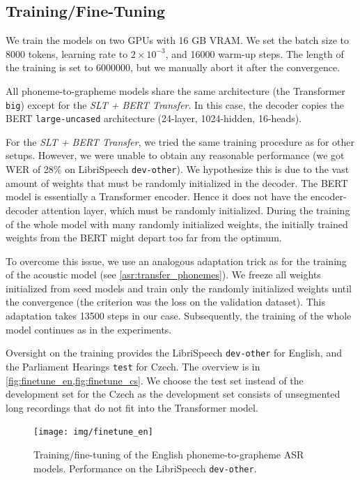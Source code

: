\subsection{Training/Fine-Tuning}
We train the models on two GPUs with 16 GB VRAM. We set the batch size to 8000 tokens, learning rate to $2 \times 10^{-3}$, and 16000 warm-up steps. The length of the training is set to 6000000, but we manually abort it after the convergence.

All phoneme-to-grapheme models share the same architecture (the Transformer \texttt{big}) except for the \emph{SLT + BERT Transfer}. In this case, the decoder copies the BERT \texttt{large-uncased} architecture (24-layer, 1024-hidden, 16-heads). 

For the \emph{SLT + BERT Transfer}, we tried the same training procedure as for other setups. However, we were unable to obtain any reasonable performance (we got WER of 28\% on LibriSpeech \texttt{dev-other}). We hypothesize this is due to the vast amount of weights that must be randomly initialized in the decoder. The BERT model is essentially a Transformer encoder. Hence it does not have the encoder-decoder attention layer, which must be randomly initialized. During the training of the whole model with many randomly initialized weights, the initially trained weights from the BERT might depart too far from the optimum.

To overcome this issue, we use an analogous adaptation trick as for the training of the acoustic model (see \cref{asr:transfer_phonemes}). We freeze all weights initialized from seed models and train only the randomly initialized weights until the convergence (the criterion was the loss on the validation dataset). This adaptation takes 13500 steps in our case. Subsequently, the training of the whole model continues as in the experiments.

Oversight on the training provides the LibriSpeech \texttt{dev-other} for English, and the Parliament Hearings \texttt{test} for Czech. The overview is in \cref{fig:finetune_en,fig:finetune_cs}. We choose the test set instead of the development set for the Czech as the development set consists of unsegmented long recordings that do not fit into the Transformer model.

\begin{figure}[h]
	\texttt{[image: img/finetune\_en]}
	\caption{Training/fine-tuning of the English phoneme-to-grapheme ASR models. Performance on the LibriSpeech \texttt{dev-other}.}
	\label{fig:finetune_en}
\end{figure}

